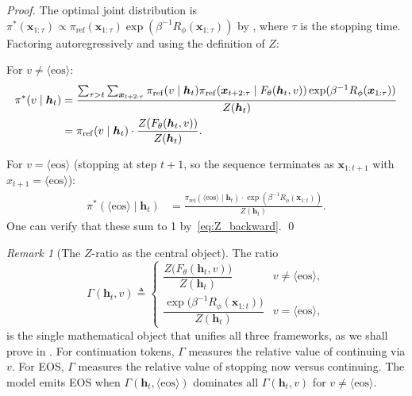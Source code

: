 \documentclass[11pt,a4paper]{article}
\theoremstyle{plain}
\theoremstyle{definition}
\theoremstyle{remark}
\newtheorem{remark}[theorem]{Remark}
\begin{document}
\begin{proof}
The optimal joint distribution is $\pi^*(\bm{x}_{1:\tau}) \propto
\pi_{\mathrm{ref}}(\bm{x}_{1:\tau}) \exp(\beta^{-1} R_\phi(\bm{x}_{1:\tau}))$
by , where $\tau$ is the stopping time. Factoring
autoregressively and using the definition of $Z$:

For $v \neq \langle\mathrm{eos}\rangle$:
\begin{align}
  \pi^*(v \mid \bm{h}_t)
  &= \frac{\sum_{\tau > t} \sum_{\bm{x}_{t+2:\tau}}
     \pi_{\mathrm{ref}}(v \mid \bm{h}_t)
     \pi_{\mathrm{ref}}(\bm{x}_{t+2:\tau} \mid F_\theta(\bm{h}_t, v))
     \exp(\beta^{-1} R_\phi(\bm{x}_{1:\tau}))}{Z(\bm{h}_t)} \notag \\
  &= \pi_{\mathrm{ref}}(v \mid \bm{h}_t) \cdot
     \frac{Z(F_\theta(\bm{h}_t, v))}{Z(\bm{h}_t)}.
\end{align}

For $v = \langle\mathrm{eos}\rangle$ (stopping at step $t+1$, so the
sequence terminates as $\bm{x}_{1:t+1}$ with $x_{t+1} = \langle\mathrm{eos}\rangle$):
\begin{align}
  \pi^*(\langle\mathrm{eos}\rangle \mid \bm{h}_t)
  &= \frac{\pi_{\mathrm{ref}}(\langle\mathrm{eos}\rangle \mid \bm{h}_t)
     \cdot \exp(\beta^{-1} R_\phi(\bm{x}_{1:t}))}{Z(\bm{h}_t)}.
\end{align}
One can verify that these sum to 1 by~\eqref{eq:Z_backward}. \qed
\end{proof}

\begin{remark}[The $Z$-ratio as the central object]
The ratio
\begin{equation}\label{eq:Z_ratio}
  \Gamma(\bm{h}_t, v) \triangleq
  \begin{cases}
    \dfrac{Z\!\bigl(F_\theta(\bm{h}_t, v)\bigr)}{Z(\bm{h}_t)}
    & v \neq \langle\mathrm{eos}\rangle, \\[1em]
    \dfrac{\exp\!\bigl(\beta^{-1} R_\phi(\bm{x}_{1:t})\bigr)}{Z(\bm{h}_t)}
    & v = \langle\mathrm{eos}\rangle,
  \end{cases}
\end{equation}
is the single mathematical object that unifies all three frameworks, as we
shall prove in . For continuation tokens, $\Gamma$ measures
the relative value of continuing via $v$. For EOS, $\Gamma$ measures the
relative value of stopping now versus continuing. The model emits EOS
when $\Gamma(\bm{h}_t, \langle\mathrm{eos}\rangle)$ dominates all
$\Gamma(\bm{h}_t, v)$ for $v \neq \langle\mathrm{eos}\rangle$.
\end{remark}
\end{document}
